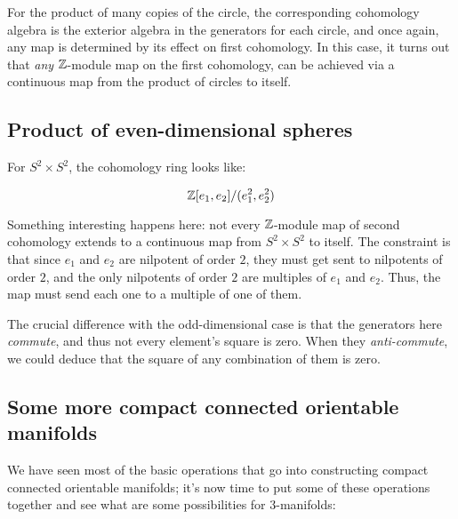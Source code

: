 \documentclass[a4paper]{amsart}
\begin{document}
For the product of many copies of the circle, the corresponding
cohomology algebra is the exterior algebra in the generators for each
circle, and once again, any map is determined by its effect on first
cohomology. In this case, it turns out that {\em any} $\mathbb{Z}$-module map
on the first cohomology, can be achieved via a continuous map from the
product of circles to itself.

\subsection{Product of even-dimensional spheres}

For $S^2 \times S^2$, the cohomology ring looks like:

$$\mathbb{Z}[e_1,e_2]/(e_1^2,e_2^2)$$

Something interesting happens here: not every $\mathbb{Z}$-module map of
second cohomology extends to a continuous map from $S^2 \times S^2$ to
itself. The constraint is that since $e_1$ and $e_2$ are nilpotent of
order $2$, they must get sent to nilpotents of order $2$, and the only
nilpotents of order $2$ are multiples of $e_1$ and $e_2$. Thus, the
map must send each one to a multiple of one of them.

The crucial difference with the odd-dimensional case is that the
generators here {\em commute}, and thus not every element's square is
zero. When they {\em anti-commute}, we could deduce that the square of
any combination of them is zero.


\subsection{Some more compact connected orientable manifolds}

We have seen most of the basic operations that go into constructing
compact connected orientable manifolds; it's now time to put some of
these operations together and see what are some possibilities for
$3$-manifolds:
\end{document}
